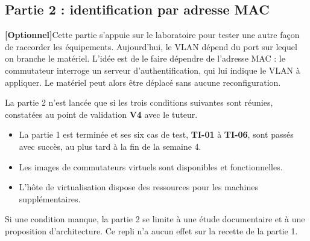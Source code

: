 \documentclass[11pt,a4paper]{article}
\newcommand{\rid}[1]{\textcolor{primary}{\textbf{\small #1}}}
\newcommand{\opt}{\textcolor{warn}{\small\textbf{[Optionnel]}}}
\begin{document}
\subsection{Partie 2 : identification par adresse MAC}
\noindent\opt\quad Cette partie s'appuie sur le laboratoire pour tester une autre façon de raccorder les équipements. Aujourd'hui, le VLAN dépend du port sur lequel on branche le matériel. L'idée est de le faire dépendre de l'adresse MAC : le commutateur interroge un serveur d'authentification, qui lui indique le VLAN à appliquer. Le matériel peut alors être déplacé sans aucune reconfiguration.

\begin{notebox}
La partie 2 n'est lancée que si les trois conditions suivantes sont réunies, constatées au point de validation \rid{V4} avec le tuteur.
\begin{itemize}[leftmargin=*,itemsep=1pt,topsep=3pt]
\item La partie 1 est terminée et ses six cas de test, \rid{TI-01} à \rid{TI-06}, sont passés avec succès, au plus tard à la fin de la semaine 4.
\item Les images de commutateurs virtuels sont disponibles et fonctionnelles.
\item L'hôte de virtualisation dispose des ressources pour les machines supplémentaires.
\end{itemize}
\vspace{2pt}
Si une condition manque, la partie 2 se limite à une étude documentaire et à une proposition d'architecture. Ce repli n'a aucun effet sur la recette de la partie 1.
\end{notebox}
\end{document}
